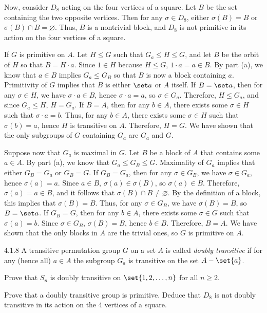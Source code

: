 \begin{solenum}
	Now, consider $D_8$ acting on the four vertices of a square.
	Let $B$ be the set containing the two opposite vertices.
	Then for any $\sigma \in D_8$, either $\sigma(B) = B$ or $\sigma(B) \cap B = \varnothing$.
	Thus, $B$ is a nontrivial block, and $D_8$ is not primitive in its action on the four vertices of a square.
	\item \rightimp If $G$ is primitive on $A$.
	Let $H \leq G$ such that $G_a \leq H \leq G$, and let $B$ be the orbit of $H$ so that $B = H \cdot a$.
	Since $1 \in H$ because $H \leq G$, $1 \cdot a = a \in B$.
	By part (a), we know that $a \in B$ implies $G_a \leq G_B$ so that $B$ is now a block containing $a$.
	Primitivity of $G$ implies that $B$ is either $\set a$ or $A$ itself.
	If $B = \set a$, then for any $\sigma \in H$, we have $\sigma \cdot a \in B$, hence $\sigma \cdot a = a$, so $\sigma \in G_a$.
	Therefore, $H \leq G_a$, and since $G_a \leq H$, $H = G_a$.
	If $B = A$, then for any $b \in A$, there exists some $\sigma \in H$ such that $\sigma \cdot a = b$.
	Thus, for any $b \in A$, there exists some $\sigma \in H$ such that $\sigma(b) = a$, hence $H$ is transitive on $A$.
	Therefore, $H = G$.
	We have shown that the only subgroups of $G$ containing $G_a$ are $G_a$ and $G$.
	
	\leftimp Suppose now that $G_a$ is maximal in $G$.
	Let $B$ be a block of $A$ that contains some $a \in A$.
	By part (a), we know that $G_a \leq G_B \leq G$.
	Maximality of $G_a$ implies that either $G_B = G_a$ or $G_B = G$.
	If $G_B = G_a$, then for any $\sigma \in G_B$, we have $\sigma \in G_a$, hence $\sigma(a) = a$.
	Since $a \in B$, $\sigma(a) \in \sigma(B)$, so $\sigma(a) \in B$.
	Therefore, $\sigma(a) = a \in B$, and it follows that $\sigma(B) \cap B \neq \varnothing$.
	By the definition of a block, this implies that $\sigma(B) = B$.
	Thus, for any $\sigma \in G_B$, we have $\sigma(B) = B$, so $B = \set a$.
	If $G_B = G$, then for any $b \in A$, there exists some $\sigma \in G$ such that $\sigma(a) = b$.
	Since $\sigma \in G_B$, $\sigma(B) = B$, hence $b \in B$.
	Therefore, $B = A$.
	We have shown that the only blocks in $A$ are the trivial ones, so $G$ is primitive on $A$.
\end{solenum}

\begin{exercise}{4.1.8}
	A transitive permutation group $G$ on a set $A$ is called \emph{doubly transitive} if for any (hence all) $a \in A$ the subgroup $G_a$ is transitive on the set $A - \set{a}$.
	\begin{subexercises}
		\item Prove that $S_n$ is doubly transitive on $\set{1,2,\ldots,n}$ for all $n \geq 2$.
		\item Prove that a doubly transitive group is primitive.
		Deduce that $D_8$ is not doubly transitive in its action on the 4 vertices of a square.
	\end{subexercises}
\end{exercise}

